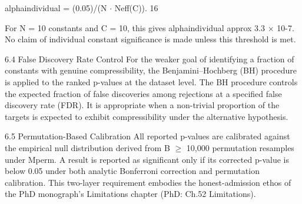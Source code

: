   alphaindividual = (0.05)/(N $\cdot$ Neff(C)). 16

  For N = 10 constants and C = 10, this gives alphaindividual approx 3.3 $\times$ 10-7. No
  claim of individual constant significance is made unless this threshold is met.

  6.4 False Discovery Rate Control
  For the weaker goal of identifying a fraction of constants with genuine compressibility,
  the Benjamini--Hochberg (BH) procedure is applied to the ranked p-values at the
  dataset level. The BH procedure controls the expected fraction of false discoveries
  among rejections at a specified false discovery rate (FDR). It is appropriate when a
  non-trivial proportion of the targets is expected to exhibit compressibility under the
  alternative hypothesis.

  6.5 Permutation-Based Calibration
  All reported p-values are calibrated against the empirical null distribution derived from
  B $\geq$ 10{,}000 permutation resamples under Mperm. A result is reported as significant
  only if its corrected p-value is below 0.05 under both analytic Bonferroni correction and
  permutation calibration. This two-layer requirement embodies the honest-admission
  ethos of the PhD monograph's Limitations chapter (PhD: Ch.52 Limitations).

